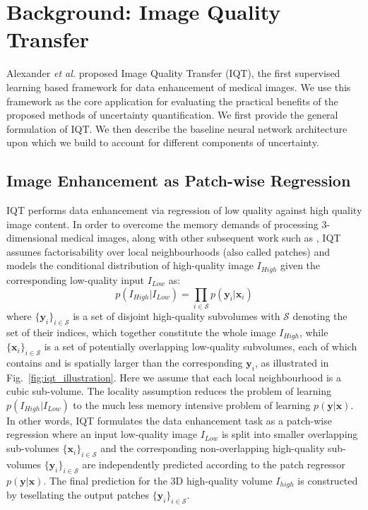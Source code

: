 \section{Background: Image Quality Transfer}
Alexander \emph{et al.} \cite{alexander2014image} proposed Image Quality Transfer (IQT), the first supervised learning based framework for data enhancement of medical images. We use this framework as the core application for evaluating the practical benefits of the proposed methods of uncertainty quantification. We first provide the general formulation of IQT. We then describe the baseline neural network architecture upon which we build to account for different components of uncertainty. 

\subsection{Image Enhancement as Patch-wise Regression}
IQT performs data enhancement via regression of low quality against high quality image content. In order to overcome the memory demands of processing 3-dimensional medical images, along with other subsequent work such as \cite{yang2016fast,oktay2016multi,bahrami2016convolutional,oktay2018anatomically}, IQT assumes factorisability over local neighbourhoods (also called patches) and models the conditional distribution of high-quality image $I_{High}$ given the corresponding low-quality input $I_{Low}$ as: 
\begin{equation}
p(I_{High}|I_{Low}) = \prod_{i\in \mathcal{S}} p(\mathbf{y}_{i}|\mathbf{x}_{i})
\end{equation}
where $\{\textbf{y}_{i}\}_{i \in \mathcal{S}}$ is a set of disjoint high-quality subvolumes with $\mathcal{S}$ denoting the set of their indices, which together constitute the whole image $I_{High}$, while $\{\textbf{x}_{i}\}_{i \in \mathcal{S}}$ is a set of potentially overlapping low-quality subvolumes, each of which contains and is spatially larger than the corresponding $\textbf{y}_{i}$, as illustrated in Fig.~\ref{fig:iqt_illustration}. Here we assume that each local neighbourhood is a cubic sub-volume. The locality assumption reduces the problem of learning $p(I_{High}|I_{Low})$ to the much less memory intensive problem of learning $p(\mathbf{y}|\mathbf{x})$. In other words, IQT formulates the data enhancement task as a patch-wise regression where an input low-quality image $I_{Low}$ is split into smaller overlapping sub-volumes  $\{\textbf{x}_{i}\}_{i \in \mathcal{S}}$ and the corresponding non-overlapping high-quality sub-volumes $\{\textbf{y}_{i}\}_{i \in \mathcal{S}}$ are independently predicted according to the patch regressor $p(\mathbf{y}|\mathbf{x})$. The final prediction for the 3D high-quality volume $I_{high}$ is constructed by tesellating the output patches $\{\textbf{y}_{i}\}_{i \in \mathcal{S}}$. 

